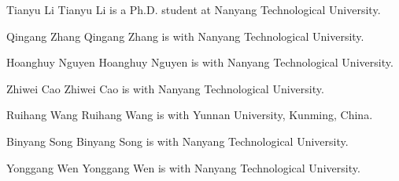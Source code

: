 \documentclass[journal]{IEEEtran}
\newif\ifblindreview
\begin{document}

\ifblindreview\else\fi

\FloatBarrier
\ifblindreview\else
\begin{IEEEbiographynophoto}{Tianyu Li}
Tianyu Li is a Ph.D. student at Nanyang Technological University.
\end{IEEEbiographynophoto}
\begin{IEEEbiographynophoto}{Qingang Zhang}
Qingang Zhang is with Nanyang Technological University.
\end{IEEEbiographynophoto}
\begin{IEEEbiographynophoto}{Hoanghuy Nguyen}
Hoanghuy Nguyen is with Nanyang Technological University.
\end{IEEEbiographynophoto}
\begin{IEEEbiographynophoto}{Zhiwei Cao}
Zhiwei Cao is with Nanyang Technological University.
\end{IEEEbiographynophoto}
\begin{IEEEbiographynophoto}{Ruihang Wang}
Ruihang Wang is with Yunnan University, Kunming, China.
\end{IEEEbiographynophoto}
\begin{IEEEbiographynophoto}{Binyang Song}
Binyang Song is with Nanyang Technological University.
\end{IEEEbiographynophoto}
\begin{IEEEbiographynophoto}{Yonggang Wen}
Yonggang Wen is with Nanyang Technological University.
\end{IEEEbiographynophoto}
\fi
\end{document}
